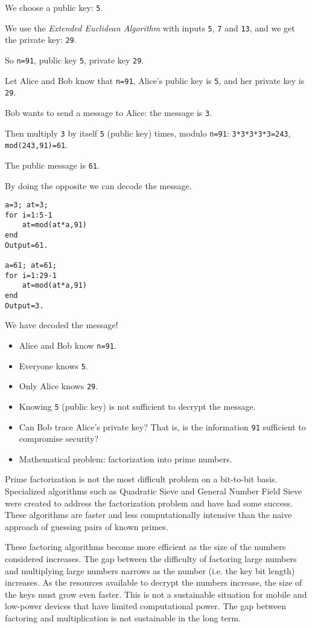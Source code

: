We choose a public key: \texttt{5}.

We use the \textit{Extended Euclidean Algorithm} with inputs \texttt{5}, \texttt{7} and \texttt{13}, and we get the private key: \texttt{29}.

So \texttt{n=91}, public key \texttt{5}, private key \texttt{29}.

Let Alice and Bob know that \texttt{n=91}, Alice's public key is \texttt{5}, and her private key is \texttt{29}.

Bob wants to send a message to Alice: the message is \texttt{3}.

Then multiply \texttt{3} by itself \texttt{5} (public key) times, modulo \texttt{n=91}: \texttt{3*3*3*3*3=243}, \texttt{mod(243,91)=61}.

The public message is \texttt{61}.

By doing the opposite we can decode the message.

\begin{verbatim}
a=3; at=3;
for i=1:5-1
    at=mod(at*a,91)
end
Output=61.

a=61; at=61;
for i=1:29-1
    at=mod(at*a,91)
end
Output=3.
\end{verbatim}

We have decoded the message!

\begin{itemize}
    \item Alice and Bob know \texttt{n=91}.
    \item Everyone knows \texttt{5}.
    \item Only Alice knows \texttt{29}.
    \item Knowing \texttt{5} (public key) is not sufficient to decrypt the message.
    \item Can Bob trace Alice's private key? That is, is the information \texttt{91} sufficient to compromise security?
    \item Mathematical problem: factorization into prime numbers.
\end{itemize}

Prime factorization is not the most difficult problem on a bit-to-bit basis. Specialized algorithms such as Quadratic Sieve and General Number Field Sieve were created to address the factorization problem and have had some success. These algorithms are faster and less computationally intensive than the naive approach of guessing pairs of known primes.

These factoring algorithms become more efficient as the size of the numbers considered increases. The gap between the difficulty of factoring large numbers and multiplying large numbers narrows as the number (i.e. the key bit length) increases. As the resources available to decrypt the numbers increase, the size of the keys must grow even faster. This is not a sustainable situation for mobile and low-power devices that have limited computational power. The gap between factoring and multiplication is not sustainable in the long term.

